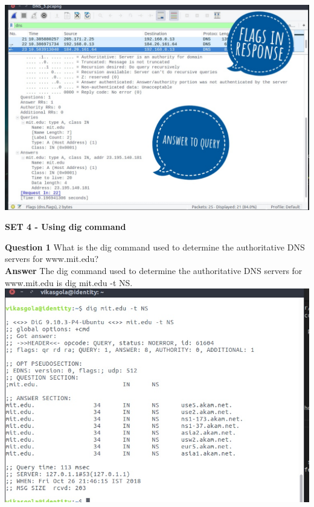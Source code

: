 \documentclass[14pt]{extarticle}
\begin{document}
    \includegraphics[scale=0.45]{3_10_2}\\[10pt]
    \vspace{1cm}
    
    \begin{center}
        {\Large \textbf{SET 4 - Using dig command}}
    \end{center}

    \noindent
    \textbf{\large Question 1}
    What is the dig command used to determine the authoritative DNS servers for www.mit.edu?\\[10pt]
    \textbf{\large Answer}
    The dig command used to determine the authoritative DNS servers for www.mit.edu is \textsf{dig mit.edu -t NS}.\\[10pt]
    \includegraphics[scale=0.65]{4_1}
    \vspace{1cm}
\end{document}
